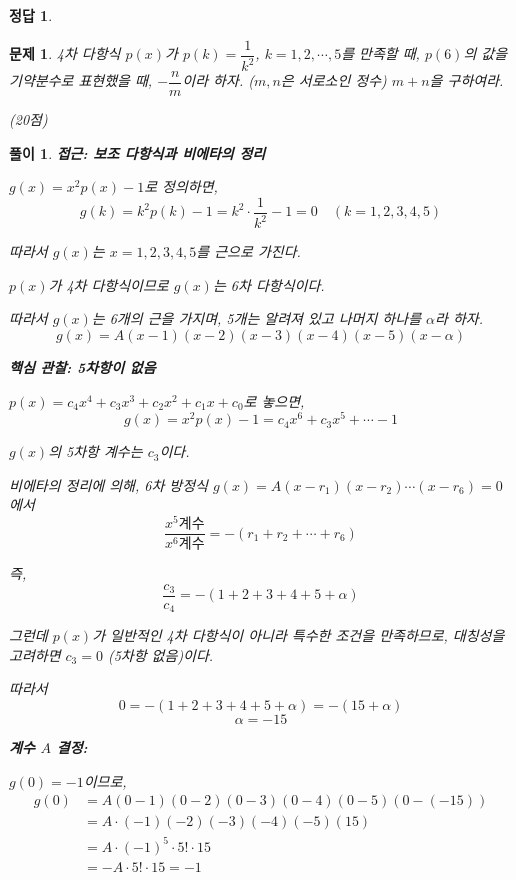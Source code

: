 \documentclass[12pt,a4paper]{article}
\theoremstyle{test_form}
\newtheorem{problem}{문제}[section]
\newtheorem*{solution}{풀이}
\newtheorem*{answer}{정답}
\begin{document}
\begin{answer}
\hfill {}
\end{answer}

\newpage

\begin{problem}

4차 다항식 \(p(x)\)가 \(p(k) = \dfrac{1}{k^2}\), \(k = 1, 2, \cdots, 5\)를 만족할 때, \(p(6)\)의 값을 기약분수로 표현했을 때, \(-\dfrac{n}{m}\)이라 하자. (\(m, n\)은 서로소인 정수) \(m+n\)을 구하여라.

\begin{flushright}(20점)\end{flushright}

\end{problem}

\begin{solution}

\setlength{\parindent}{0pt}

\textbf{접근: 보조 다항식과 비에타의 정리}

\(g(x) = x^2 p(x) - 1\)로 정의하면,
\[
g(k) = k^2 p(k) - 1 = k^2 \cdot \frac{1}{k^2} - 1 = 0 \quad (k = 1, 2, 3, 4, 5)
\]

따라서 \(g(x)\)는 \(x = 1, 2, 3, 4, 5\)를 근으로 가진다.

\(p(x)\)가 4차 다항식이므로 \(g(x)\)는 6차 다항식이다.

따라서 \(g(x)\)는 6개의 근을 가지며, 5개는 알려져 있고 나머지 하나를 \(\alpha\)라 하자.
\[
g(x) = A(x-1)(x-2)(x-3)(x-4)(x-5)(x-\alpha)
\]

\textbf{핵심 관찰: 5차항이 없음}

\(p(x) = c_4 x^4 + c_3 x^3 + c_2 x^2 + c_1 x + c_0\)로 놓으면,
\[
g(x) = x^2 p(x) - 1 = c_4 x^6 + c_3 x^5 + \cdots - 1
\]

\(g(x)\)의 5차항 계수는 \(c_3\)이다.

비에타의 정리에 의해, 6차 방정식 \(g(x) = A(x-r_1)(x-r_2)\cdots(x-r_6) = 0\)에서
\[
\frac{{x}^5 \text{계수}}{{x}^6 \text{계수}} = -(r_1 + r_2 + \cdots + r_6)
\]

즉,
\[
\frac{c_3}{c_4} = -(1 + 2 + 3 + 4 + 5 + \alpha)
\]

그런데 \(p(x)\)가 일반적인 4차 다항식이 아니라 특수한 조건을 만족하므로,
대칭성을 고려하면 \(c_3 = 0\) (5차항 없음)이다.

따라서
\[
0 = -(1 + 2 + 3 + 4 + 5 + \alpha) = -(15 + \alpha)
\]
\[
\alpha = -15
\]

\textbf{계수 \(A\) 결정:}

\(g(0) = -1\)이므로,
\[
\begin{aligned}
g(0) &= A(0-1)(0-2)(0-3)(0-4)(0-5)(0-(-15)) \\
&= A \cdot (-1)(-2)(-3)(-4)(-5)(15) \\
&= A \cdot (-1)^5 \cdot 5! \cdot 15 \\
&= -A \cdot 5! \cdot 15 = -1
\end{aligned}
\]


\end{solution}
\end{document}
